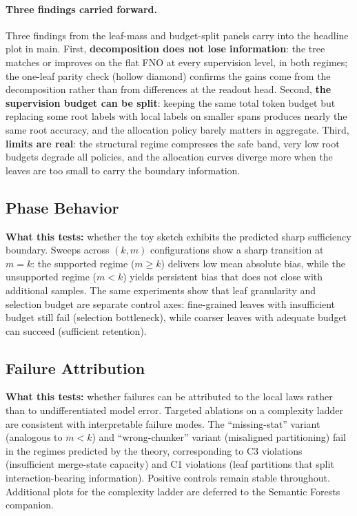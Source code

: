 \paragraph{Three findings carried forward.}
Three findings from the leaf-mass and budget-split panels carry into
the headline plot in main. First, \textbf{decomposition does not lose
information}: the tree matches or improves on the flat FNO at every
supervision level, in both regimes; the one-leaf parity check
(hollow diamond) confirms the gains come from the decomposition
rather than from differences at the readout head. Second, \textbf{the
supervision budget can be split}: keeping the same total token
budget but replacing some root labels with local labels on smaller
spans produces nearly the same root accuracy, and the allocation
policy barely matters in aggregate. Third, \textbf{limits are real}:
the structural regime compresses the safe band, very low root
budgets degrade all policies, and the allocation curves diverge more
when the leaves are too small to carry the boundary information.

\subsection{Phase Behavior}

\textbf{What this tests:} whether the toy sketch exhibits the predicted sharp sufficiency boundary. Sweeps across $(k,m)$ configurations show a sharp transition at $m = k$: the supported regime ($m \ge k$) delivers low mean absolute bias, while the unsupported regime ($m < k$) yields persistent bias that does not close with additional samples. The same experiments show that leaf granularity and selection budget are separate control axes: fine-grained leaves with insufficient budget still fail (selection bottleneck), while coarser leaves with adequate budget can succeed (sufficient retention).

\subsection{Failure Attribution}

\textbf{What this tests:} whether failures can be attributed to the local laws rather than to undifferentiated model error. Targeted ablations on a complexity ladder are consistent with interpretable failure modes. The ``missing-stat'' variant (analogous to $m < k$) and ``wrong-chunker'' variant (misaligned partitioning) fail in the regimes predicted by the theory, corresponding to C3 violations (insufficient merge-state capacity) and C1 violations (leaf partitions that split interaction-bearing information). Positive controls remain stable throughout. Additional plots for the complexity ladder are deferred to the Semantic Forests companion.

